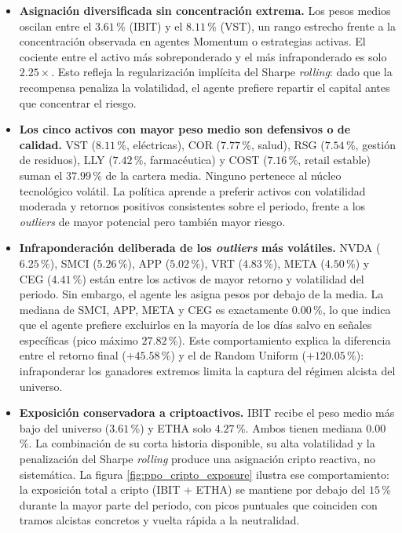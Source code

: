 \documentclass[IB,a4paper]{TFUOC}
\begin{document}
\begin{itemize}
    \item \textbf{Asignación diversificada sin concentración extrema.} Los pesos medios oscilan entre el $3.61$\,\% (IBIT) y el $8.11$\,\% (VST), un rango estrecho frente a la concentración observada en agentes Momentum o estrategias activas. El cociente entre el activo más sobreponderado y el más infraponderado es solo $2.25\times$. Esto refleja la regularización implícita del Sharpe \textit{rolling}: dado que la recompensa penaliza la volatilidad, el agente prefiere repartir el capital antes que concentrar el riesgo.

    \item \textbf{Los cinco activos con mayor peso medio son defensivos o de calidad.} VST ($8.11$\,\%, eléctricas), COR ($7.77$\,\%, salud), RSG ($7.54$\,\%, gestión de residuos), LLY ($7.42$\,\%, farmacéutica) y COST ($7.16$\,\%, retail estable) suman el $37.99$\,\% de la cartera media. Ninguno pertenece al núcleo tecnológico volátil. La política aprende a preferir activos con volatilidad moderada y retornos positivos consistentes sobre el periodo, frente a los \textit{outliers} de mayor potencial pero también mayor riesgo.

    \item \textbf{Infraponderación deliberada de los \textit{outliers} más volátiles.} NVDA ($6.25$\,\%), SMCI ($5.26$\,\%), APP ($5.02$\,\%), VRT ($4.83$\,\%), META ($4.50$\,\%) y CEG ($4.41$\,\%) están entre los activos de mayor retorno y volatilidad del periodo. Sin embargo, el agente les asigna pesos por debajo de la media. La mediana de SMCI, APP, META y CEG es exactamente $0.00$\,\%, lo que indica que el agente prefiere excluirlos en la mayoría de los días salvo en señales específicas (pico máximo $27.82$\,\%). Este comportamiento explica la diferencia entre el retorno final ($+45.58$\,\%) y el de Random Uniform ($+120.05$\,\%): infraponderar los ganadores extremos limita la captura del régimen alcista del universo.

    \item \textbf{Exposición conservadora a criptoactivos.} IBIT recibe el peso medio más bajo del universo ($3.61$\,\%) y ETHA solo $4.27$\,\%. Ambos tienen mediana $0.00$\,\%. La combinación de su corta historia disponible, su alta volatilidad y la penalización del Sharpe \textit{rolling} produce una asignación cripto reactiva, no sistemática. La figura \ref{fig:ppo_cripto_exposure} ilustra ese comportamiento: la exposición total a cripto (IBIT + ETHA) se mantiene por debajo del $15$\,\% durante la mayor parte del periodo, con picos puntuales que coinciden con tramos alcistas concretos y vuelta rápida a la neutralidad.
\end{itemize}
\end{document}
